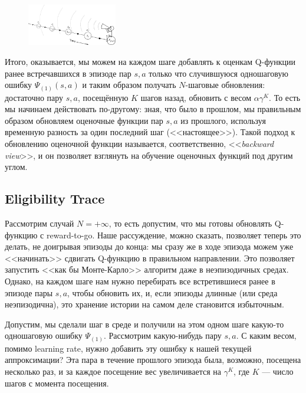 \begin{figure}
\centering
\includegraphics[width=0.35\textwidth]{Images/backward_view.png}
\end{figure}
Итого, оказывается, мы можем на каждом шаге добавлять к оценкам Q-функции ранее встречавшихся в эпизоде пар $s, a$ только что случившуюся одношаговую ошибку $\Psi_{(1)}(s, a)$ и таким образом получать $N$-шаговые обновления: достаточно пару $s, a$, посещённую $K$ шагов назад, обновить с весом $\alpha \gamma^K$. То есть мы начинаем действовать по-другому: зная, что было в прошлом, мы правильным образом обновляем оценочные функции пар $s, a$ из прошлого, используя временную разность за один последний шаг (<<настоящее>>). Такой подход к обновлению оценочной функции называется, соответственно, <<\emph{backward view}>>, и он позволяет взглянуть на обучение оценочных функций под другим углом.

\subsection{Eligibility Trace}

Рассмотрим случай $N = +\infty$, то есть допустим, что мы готовы обновлять Q-функцию с reward-to-go. Наше рассуждение, можно сказать, позволяет теперь это делать, не доигрывая эпизоды до конца: мы сразу же в ходе эпизода можем уже <<начинать>> сдвигать Q-функцию в правильном направлении. Это позволяет запустить <<как бы Монте-Карло>> алгоритм даже в неэпизодичных средах. Однако, на каждом шаге нам нужно перебирать все встретившиеся ранее в эпизоде пары $s, a$, чтобы обновить их, и, если эпизоды длинные (или среда неэпизодична), это хранение истории на самом деле становится избыточным. 

Допустим, мы сделали шаг в среде и получили на этом одном шаге какую-то одношаговую ошибку $\Psi_{(1)}$. Рассмотрим какую-нибудь пару $s, a$. С каким весом, помимо learning rate, нужно добавить эту ошибку к нашей текущей аппроксимации? Эта пара в течение прошлого эпизода была, возможно, посещена несколько раз, и за каждое посещение вес увеличивается на $\gamma^K$, где $K$ --- число шагов с момента посещения.

